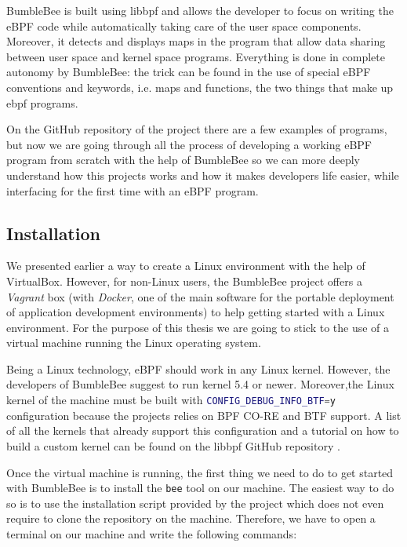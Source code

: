 BumbleBee is built using libbpf and allows the developer to focus on writing the eBPF code while automatically taking care of the user space components. 
Moreover, it detects and displays maps in the program that allow data sharing between user space and kernel space programs. 
Everything is done in complete autonomy by BumbleBee: the trick can be found in the use of special eBPF conventions and keywords, i.e. maps and functions, the two things that make up ebpf programs.

On the GitHub repository of the project there are a few examples of programs, but now we are going through all the process of developing a working eBPF program from scratch with the help of BumbleBee so we can more deeply understand how this projects works and how it makes developers life easier, while interfacing for the first time with an eBPF program.

\subsection{Installation}

We presented earlier a way to create a Linux environment with the help of VirtualBox.
However, for non-Linux users, the BumbleBee project offers a \textit{Vagrant} box \cite{BumbleBeeVagrant} (with \textit{Docker}, one of the main software for the portable deployment of application development environments) to help getting started with a Linux environment.
For the purpose of this thesis we are going to stick to the use of a virtual machine running the Linux operating system.

Being a Linux technology, eBPF should work in any Linux kernel.
However, the developers of BumbleBee suggest to run kernel 5.4 or newer.
Moreover,the Linux kernel of the machine must be built with \colorbox{backcolour}{\lstinline[style=commandline, language=bash, breaklines=true]|CONFIG_DEBUG_INFO_BTF=y|} configuration because the projects relies on BPF CO-RE and BTF support.
A list of all the kernels that already support this configuration and a tutorial on how to build a custom kernel can be found on the libbpf GitHub repository \cite{BTFKernelConfig}.

Once the virtual machine is running, the first thing we need to do to get started with BumbleBee is to install the \colorbox{backcolour}{\lstinline[style=commandline, language=bash, breaklines=true]|bee|} tool on our machine.
The easiest way to do so is to use the installation script provided by the project which does not even require to clone the repository on the machine.
Therefore, we have to open a terminal on our machine and write the following commands:


